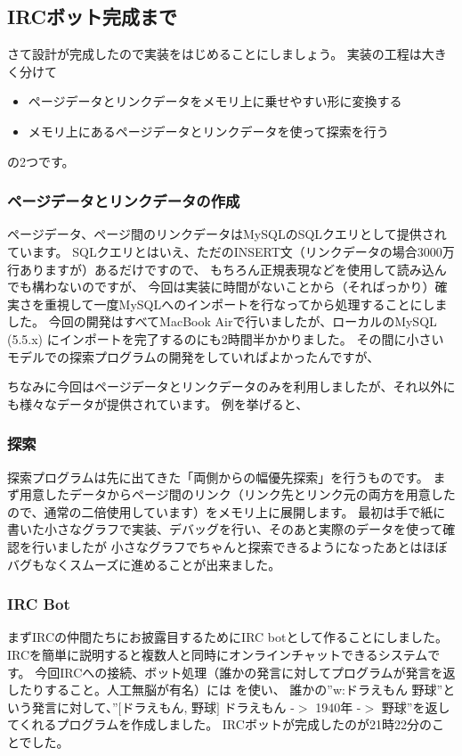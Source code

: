 \subsection{IRCボット完成まで}
さて設計が完成したので実装をはじめることにしましょう。
実装の工程は大きく分けて
\begin{itemize}
\item ページデータとリンクデータをメモリ上に乗せやすい形に変換する
\item メモリ上にあるページデータとリンクデータを使って探索を行う
\end{itemize}
の2つです。

\subsubsection{ページデータとリンクデータの作成}
ページデータ、ページ間のリンクデータはMySQLのSQLクエリとして提供されています。
SQLクエリとはいえ、ただのINSERT文（リンクデータの場合3000万行ありますが）あるだけですので、
もちろん正規表現などを使用して読み込んでも構わないのですが、
今回は実装に時間がないことから（そればっかり）確実さを重視して一度MySQLへのインポートを行なってから処理することにしました。
今回の開発はすべてMacBook Airで行いましたが、ローカルのMySQL (5.5.x) にインポートを完了するのにも2時間半かかりました。
その間に小さいモデルでの探索プログラムの開発をしていればよかったんですが、

ちなみに今回はページデータとリンクデータのみを利用しましたが、それ以外にも様々なデータが提供されています。
例を挙げると、

\subsubsection{探索}
探索プログラムは先に出てきた「両側からの幅優先探索」を行うものです。
まず用意したデータからページ間のリンク（リンク先とリンク元の両方を用意したので、通常の二倍使用しています）をメモリ上に展開します。
最初は手で紙に書いた小さなグラフで実装、デバッグを行い、そのあと実際のデータを使って確認を行いましたが
小さなグラフでちゃんと探索できるようになったあとはほぼバグもなくスムーズに進めることが出来ました。

\subsubsection{IRC Bot}
まずIRCの仲間たちにお披露目するためにIRC botとして作ることにしました。
IRCを簡単に説明すると複数人と同時にオンラインチャットできるシステムです。
今回IRCへの接続、ボット処理（誰かの発言に対してプログラムが発言を返したりすること。人工無脳が有名）には
を使い、
誰かの''w:ドラえもん 野球''という発言に対して、''$[$ドラえもん, 野球$]$ ドラえもん -$>$ 1940年 -$>$ 野球''を返してくれるプログラムを作成しました。
IRCボットが完成したのが21時22分のことでした。

